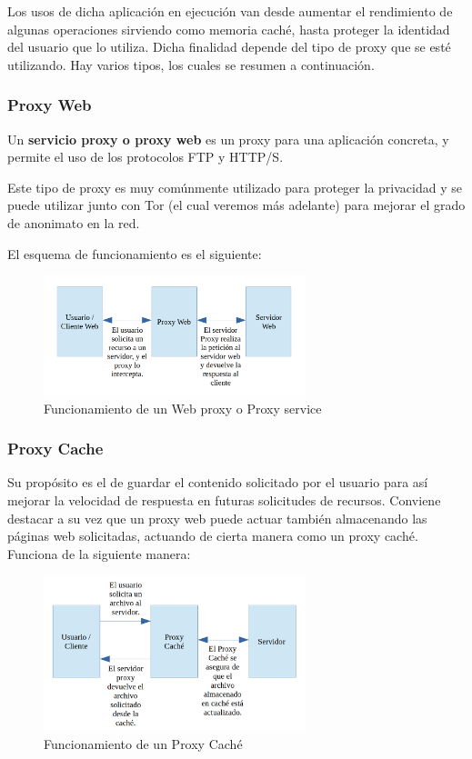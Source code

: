Los usos de dicha aplicación en ejecución van desde aumentar el rendimiento de algunas operaciones sirviendo como memoria caché, hasta proteger la identidad del usuario que lo utiliza.
Dicha finalidad depende del tipo de proxy que se esté utilizando.
Hay varios tipos, los cuales se resumen a continuación.

\subsubsection{Proxy Web}

Un \textbf{servicio proxy o proxy web} es un proxy para una aplicación concreta, y permite el uso de los protocolos FTP y HTTP/S.

Este tipo de proxy es muy comúnmente utilizado para proteger la privacidad y se puede utilizar junto con Tor (el cual veremos más adelante) para mejorar el grado de anonimato en la red.

El esquema de funcionamiento es el siguiente:

\begin{figure}[h]
	\centerline{
		\mbox{\includegraphics[width=3.00in]{images/proxy_web.png}}
	}
	\caption{Funcionamiento de un Web proxy o Proxy service}
	\label{fig:web_proxy}
\end{figure}

\subsubsection{Proxy Cache}

Su propósito es el de guardar el contenido solicitado por el usuario para así mejorar la velocidad de respuesta en futuras solicitudes de recursos. 
Conviene destacar a su vez que un proxy web puede actuar también almacenando las páginas web solicitadas, actuando de cierta manera como un proxy caché. Funciona de la siguiente manera:

\begin{figure}[h]
	\centerline{
		\mbox{\includegraphics[width=3.00in]{images/proxy_cache.png}}
	}
	\caption{Funcionamiento de un Proxy Caché}
	\label{fig:proxy_cache}
\end{figure}

